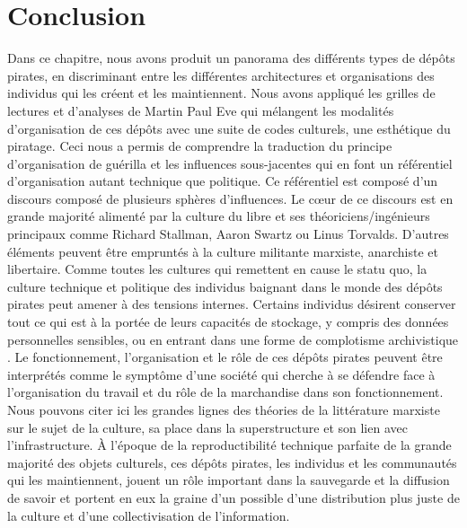 \section{Conclusion}

Dans ce chapitre, nous avons produit un panorama des différents types de dépôts pirates, en discriminant entre les différentes architectures et organisations des individus qui les créent et les maintiennent. Nous avons appliqué les grilles de lectures et d'analyses de Martin Paul Eve qui mélangent les modalités d'organisation de ces dépôts avec une suite de codes culturels, une esthétique du piratage. Ceci nous a permis de comprendre la traduction du principe d'organisation de guérilla et les influences sous-jacentes qui en font un référentiel d'organisation autant technique que politique. Ce référentiel est composé d'un discours composé de plusieurs sphères d'influences. Le cœur de ce discours est en grande majorité alimenté par la culture du libre et ses théoriciens/ingénieurs principaux comme Richard Stallman, Aaron Swartz ou Linus Torvalds. D'autres éléments peuvent être empruntés à la culture militante marxiste, anarchiste et libertaire. Comme toutes les cultures qui remettent en cause le statu quo, la culture technique et politique des individus baignant dans le monde des dépôts pirates peut amener à des tensions internes. Certains individus désirent conserver tout ce qui est à la portée de leurs capacités de stockage, y compris des données personnelles sensibles, ou en entrant dans une forme de \og complotisme archivistique \fg. Le fonctionnement, l'organisation et le rôle de ces dépôts pirates peuvent être interprétés comme le symptôme d'une société qui cherche à se défendre face à l'organisation du travail et du rôle de la marchandise dans son fonctionnement. Nous pouvons citer ici les grandes lignes des théories de la littérature marxiste sur le sujet de la culture, sa place dans la superstructure et son lien avec l'infrastructure. À l'époque de la reproductibilité technique parfaite de la grande majorité des objets culturels, ces dépôts pirates, les individus et les communautés qui les maintiennent, jouent un rôle important dans la sauvegarde et la diffusion de savoir et portent en eux la graine d'un possible d'une distribution plus juste de la culture et d'une collectivisation de l'information. 



